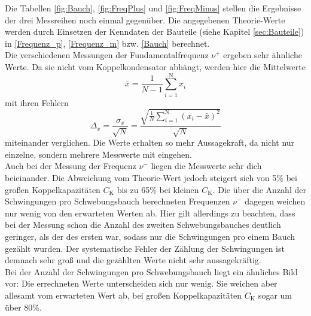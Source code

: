 Die Tabellen \ref{fig:Bauch}, \ref{fig:FreqPlus} und \ref{fig:FreqMinus} stellen die Ergebnisse der drei Messreihen noch einmal gegenüber. Die angegebenen Theorie-Werte werden durch Einsetzen der Kenndaten der Bauteile (siehe Kapitel \ref{sec:Bauteile}) in \eqref{Frequenz_p}, \eqref{Frequenz_m} bzw. \eqref{Bauch} berechnet. \\
Die verschiedenen Messungen der Fundamentalfrequenz $\nu^+$ ergeben sehr ähnliche Werte. Da sie nicht vom Koppelkondensator abhängt, werden hier die Mittelwerte
\[ \bar{x} = \frac{1}{N-1} \sum_{i=1}^\text{N} x_i \]
mit ihren Fehlern
\[ \Delta_{x} = \frac{\sigma_x}{\sqrt{N}} = \frac{\sqrt{\frac{1}{N} \sum_{i=1}^\text{N} (x_i - \bar{x})^2}}{\sqrt{N}} \]
miteinander verglichen. Die Werte erhalten so mehr Aussagekraft, da nicht nur einzelne, sondern mehrere Messwerte mit eingehen.
 \\
Auch bei der Messung der Frequenz $\nu^-$ liegen die Messwerte sehr dich beieinander. Die Abweichung vom Theorie-Wert jedoch steigert sich von 5\% bei großen Koppelkapazitäten $C_\text{K}$ bis zu 65\% bei kleinen $C_\text{K}$. Die über die Anzahl der Schwingungen pro Schwebungsbauch berechneten Frequenzen $\nu^-$ dagegen weichen nur wenig von den erwarteten Werten ab. Hier gilt allerdings zu beachten, dass bei der Messung schon die Anzahl des zweiten Schwebungsbauches deutlich geringer, als der des ersten war, sodass nur die Schwingungen pro einem Bauch gezählt wurden. Der systematische Fehler der Zählung der Schwingungen ist demnach sehr groß und die gezählten Werte nicht sehr aussagekräftig.
 \\
Bei der Anzahl der Schwingungen pro Schwebungsbauch liegt ein ähnliches Bild vor: Die errechneten Werte unterscheiden sich nur wenig. Sie weichen aber allesamt vom erwarteten Wert ab, bei großen Koppelkapazitäten $C_\text{K}$ sogar um über 80\%.

